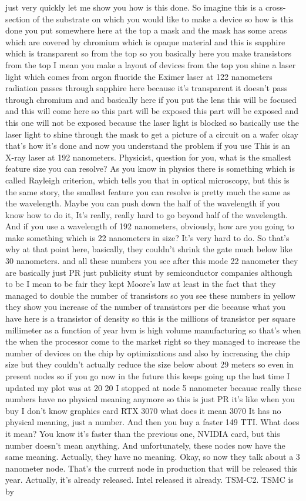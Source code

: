 just very quickly let me show you how is this done. So imagine this is a cross-section of the substrate on which you would like to make a device so how is this done you put somewhere here at the top a mask and the mask has some areas which are covered by chromium which is opaque material and this is sapphire which is transparent so from the top so you basically here you make transistors from the top I mean you make a layout of devices from the top you shine a laser light which comes from argon fluoride the Eximer laser at 122 nanometers radiation passes through sapphire here because it's transparent it doesn't pass through chromium and and basically here if you put the lens this will be focused and this will come here so this part will be exposed this part will be exposed and this one will not be exposed because the laser light is blocked so basically use the laser light to shine through the mask to get a picture of a circuit on a wafer okay that's how it's done and now you understand the problem if you use This is an X-ray laser at 192 nanometers. Physicist, question for you, what is the smallest feature size you can resolve? As you know in physics there is something which is called Rayleigh criterion, which tells you that in optical microscopy, but this is the same story, the smallest feature you can resolve is pretty much the same as the wavelength. Maybe you can push down the half of the wavelength if you know how to do it, It's really, really hard to go beyond half of the wavelength. And if you use a wavelength of 192 nanometers, obviously, how are you going to make something which is 22 nanometers in size? It's very hard to do. So that's why at that point here, basically, they couldn't shrink the gate much below like 30 nanometers. and all these numbers you see after this mode 22 nanometer they are basically just PR just publicity stunt by semiconductor companies although to be I mean to be fair they kept Moore's law at least in the fact that they managed to double the number of transistors so you see these numbers in yellow they show you increase of the number of transistors per die because what you have here is a transistor of density so this is the millions of transistor per square millimeter as a function of year hvm is high volume manufacturing so that's when the when the processor come to the market right so they managed to increase the number of devices on the chip by optimizations and also by increasing the chip size but they couldn't actually reduce the size below about 29 meters so even in present nodes so if you go now in the future this keeps going up the last time I updated my plot was at 20 20 I stopped at node 5 nanometer because really these numbers have no physical meaning anymore so this is just PR it's like when you buy I don't know graphics card RTX 3070 what does it mean 3070 It has no physical meaning, just a number. And then you buy a faster 149 TTI. What does it mean? You know it's faster than the previous one, NVIDIA card, but this number doesn't mean anything. And unfortunately, these nodes now have the same meaning. Actually, they have no meaning. Okay, so now they talk about a 3 nanometer node. That's the current node in production that will be released this year. Actually, it's already released. Intel released it already. TSM-C2. TSMC is by 
